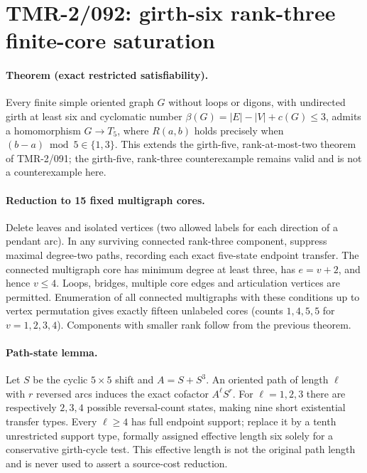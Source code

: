 \documentclass[11pt]{article}
\begin{document}
\section{TMR-2/092: girth-six rank-three finite-core saturation}

\paragraph{Theorem (exact restricted satisfiability).}
Every finite simple oriented graph $G$ without loops or digons, with
undirected girth at least six and cyclomatic number
$\beta(G)=|E|-|V|+c(G)\leq 3$, admits a homomorphism $G\to T_5$,
where $R(a,b)$ holds precisely when
$(b-a)\bmod 5\in\{1,3\}$.
This extends the girth-five, rank-at-most-two theorem of
TMR-2/091; the girth-five, rank-three counterexample remains
valid and is not a counterexample here.

\paragraph{Reduction to 15 fixed multigraph cores.}
Delete leaves and isolated vertices (two allowed labels for
each direction of a pendant arc). In any surviving connected
rank-three component, suppress maximal degree-two paths,
recording each exact five-state endpoint transfer. The
connected multigraph core has minimum degree at least three,
has $e=v+2$, and hence $v\leq4$. Loops, bridges,
multiple core edges and articulation vertices are permitted.
Enumeration of all connected multigraphs with these
conditions up to vertex permutation gives exactly fifteen
unlabeled cores (counts $1,4,5,5$ for $v=1,2,3,4$).
Components with smaller rank follow from the previous theorem.

\paragraph{Path-state lemma.}
Let $S$ be the cyclic $5\times5$ shift and $A=S+S^3$.
An oriented path of length $\ell$ with $r$ reversed arcs
induces the exact cofactor $A^\ell S^r$.
For $\ell=1,2,3$ there are respectively $2,3,4$
possible reversal-count states, making nine short
existential transfer types. Every $\ell\geq4$ has full
endpoint support; replace it by a tenth unrestricted support
type, formally assigned effective length six solely
for a conservative girth-cycle test. This effective
length is not the original path length and is never
used to assert a source-cost reduction.
\end{document}
